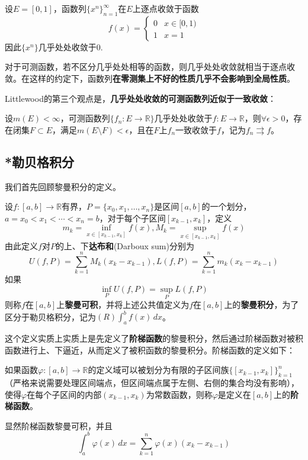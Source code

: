 \begin{example}
    设$E=[0,1]$，函数列$\{x^n\}_{n=1}^{\infty}$在$E$上逐点收敛于函数
\[f(x)=
\begin{cases}
0 & x\in [0,1)    \\
1 & x=1
\end{cases}\]
因此$\{x^n\}$几乎处处收敛于0.
\end{example}

对于可测函数，若不区分几乎处处相等的函数，则几乎处处收敛就相当于逐点收敛。在这样的约定下，函数列\textbf{在零测集上不好的性质几乎不会影响到全局性质}。

Littlewood的第三个观点是，\textbf{几乎处处收敛的可测函数列近似于一致收敛}：

\begin{theorem}[Egoroff定理]
    设$m(E)<\infty$，可测函数列$\{f_n:E\to\mathbb{R}\}$几乎处处收敛于$f:E\to\mathbb{R}$，则$\forall \epsilon>0$，存在闭集$F\subset E$，满足$m(E\setminus F)<\epsilon$，且在$F$上$f_n$一致收敛于$f$，记为$f_n\rightrightarrows f$。
\end{theorem}

\subsection{*勒贝格积分}\label{sub:integral}

我们首先回顾黎曼积分的定义。

\begin{definition}[黎曼积分]
    设$f:[a,b]\to\mathbb{R}$有界，$P=\{x_0,x_1,\dots,x_n\}$是区间$[a,b]$的一个划分，$a=x_0<x_1<\cdots <x_n=b$，对于每个子区间$[x_{k-1},x_k]$，定义
    \[m_k=\inf_{x\in [x_{k-1},x_k]}f(x),M_k=\sup_{x\in [x_{k-1},x_k]}f(x)\]
    由此定义$f$对$P$的上、下\textbf{达布和}(Darboux sum)分别为
    \[U(f,P)=\sum_{k=1}^{n}M_k(x_k-x_{k-1}),L(f,P)=\sum_{k=1}^{n}m_k(x_k-x_{k-1})\]
    如果
    \[\inf_{P}U(f,P)=\sup_{P}L(f,P)\]
    则称$f$在$[a,b]$上\textbf{黎曼可积}，并将上述公共值定义为$f$在$[a,b]$上的\textbf{黎曼积分}，为了区分于勒贝格积分，记为$(R)\int_{a}^{b}f(x)\,dx$。
\end{definition}

这个定义实质上实质上是先定义了\textbf{阶梯函数}的黎曼积分，然后通过阶梯函数对被积函数进行上、下逼近，从而定义了被积函数的黎曼积分。阶梯函数的定义如下：

\begin{definition}[阶梯函数]
    如果函数$\varphi:[a,b]\to\mathbb{R}$的定义域可以被划分为有限的子区间族$\{[x_{k-1},x_k]\}_{k=1}^{n}$（严格来说需要处理区间端点，但区间端点属于左侧、右侧的集合均没有影响），使得$\varphi$在每个子区间的内部$(x_{k-1},x_k)$为常数函数，则称$\varphi$是定义在$[a,b]$上的\textbf{阶梯函数}。

    显然阶梯函数黎曼可积，并且
    $$\int_{a}^{b}\varphi(x)\,dx=\sum_{k=1}^{n}\varphi(x)(x_k-x_{k-1})$$
\end{definition}


